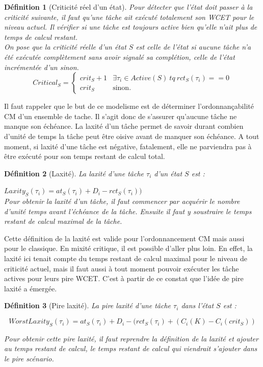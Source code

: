\documentclass[11pt,a4paper,oneside]{book}
\theoremstyle{break}
\newtheorem{defin}{Définition}
\theoremstyle{breakplain}
\begin{document}
\begin{defin}[Criticité réel d'un état]
Pour détecter que l'état doit passer à la criticité suivante, il faut qu'une tâche ait exécuté totalement son WCET pour le niveau actuel. Il vérifier si une tâche est toujours active bien qu'elle n'ait plus de temps de calcul restant.\\
On pose que la criticité réelle d'un état $S$ est celle de l'état si aucune tâche n'a été exécutée complètement sans avoir signalé sa complétion, celle de l'état incrémentée d'un sinon.
$$
Critical_S = \left\{
    \begin{array}{ll}
        crit_S+1 & \exists \tau_i \in Active(S)\ tq\ rct_S(\tau_i) == 0 \\
        crit_S & \mbox{sinon.}
    \end{array}
\right.
$$
\end{defin}

Il faut rappeler que le but de ce modelisme est de déterminer l'ordonnançabilité CM d'un ensemble de tache. Il s'agit donc de s'assurer qu'aucune tâche ne manque son échéance. La laxité d'un tâche permet de savoir durant combien d'unité de temps la tâche peut être oisive avant de manquer son échéance. A tout moment, si laxité d'une tâche est négative, fatalement,  elle ne parviendra pas à être exécuté pour son temps restant de calcul total.

\begin{defin}[Laxité]
La laxité d'une tâche $\tau_i$ d'un état $S$ est :

$Laxity_S(\tau_i) = at_S(\tau_i)  + D_i - rct_S(\tau_i))$\\

Pour obtenir la laxité d'un tâche, il faut commencer par acquérir le nombre d'unité temps avant l'échéance de la tâche. Ensuite il faut y soustraire le temps restant de calcul maximal de la tâche.
\end{defin}

Cette définition de la laxité est valide pour l'ordonnancement CM mais aussi pour le classique. En mixité critique, il est possible d'aller plus loin. En effet, la laxité ici tenait compte du temps restant de calcul maximal pour le niveau de criticité actuel, mais il faut aussi à tout moment pouvoir exécuter les tâche actives pour leurs pire WCET. C'est à partir de ce constat que l'idée de pire laxité a émergée.

\begin{defin}[Pire laxité]
\label{per:worstlaxity}
La pire laxité d'une tâche $\tau_i$ dans l'état $S$ est :

$$
WorstLaxity_S(\tau_i) = at_S(\tau_i) + D_i - (rct_S(\tau_i) + (C_i(K)-C_i(crit_S))
$$

Pour obtenir cette pire laxité, il faut reprendre la définition de la laxité et ajouter au temps restant de calcul, le temps restant de calcul qui viendrait s'ajouter dans le pire scénario.
\end{defin}
\end{document}
